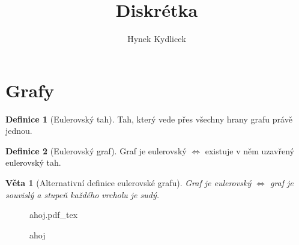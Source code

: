 \documentclass[a4paper]{article}
\author{Hynek Kydlicek}
\title{Diskrétka}
\newcommand{\incfig}[1]{%
    \def\svgwidth{\columnwidth}
    {#1.pdf_tex}
}
\newtheorem{theorem}{Věta}[section]
\theoremstyle{definition}
\newtheorem{definition}{Definice}[section]
\begin{document}
\maketitle
\section{Grafy}
\begin{definition}[Eulerovský tah]
    Tah, který vede přes všechny hrany grafu právě jednou.
\end{definition}
\begin{definition}[Eulerovský graf]
    Graf je eulerovský $\iff$ existuje v něm uzavřený eulerovský tah.
\end{definition}
\begin{theorem}[Alternativní definice eulerovské grafu]
    Graf je eulerovský $\iff$ graf je souvislý a stupeň každého vrcholu je sudý.
\end{theorem}
\begin{figure}[ht]
    \centering
    \incfig{ahoj}
    \caption{ahoj}
    \label{fig:ahoj}
\end{figure}
\end{document}
